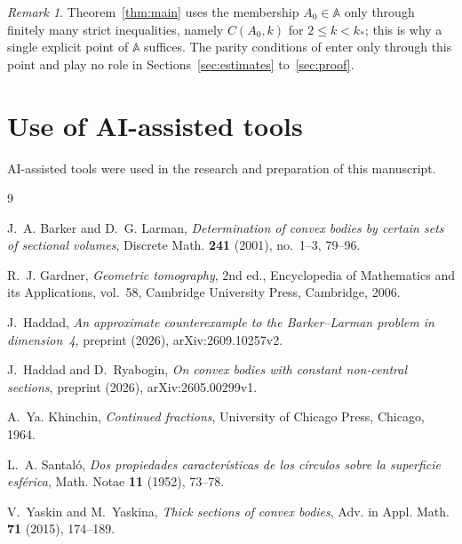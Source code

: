 \documentclass{amsart}
\theoremstyle{definition}
\theoremstyle{remark}
\newtheorem{remark}[theorem]{Remark}
\numberwithin{equation}{section}
\newcommand{\AAA}{\mathbb{A}}
\begin{document}
\begin{remark}
Theorem~\ref{thm:main} uses the membership $A_0\in\AAA$ only through finitely many strict inequalities, namely $C(A_0,k)$ for $2\le k<k_*$; this is why a single explicit point of $\AAA$ suffices. The parity conditions of \cite[Theorem~14]{HR} enter only through this point and play no role in Sections~\ref{sec:estimates} to~\ref{sec:proof}.
\end{remark}

\section*{Use of AI-assisted tools}

AI-assisted tools were used in the research and preparation of this manuscript.

\begin{thebibliography}{9}

J.~A. Barker and D.~G. Larman, \emph{Determination of convex bodies by certain sets of sectional volumes}, Discrete Math. \textbf{241} (2001), no.~1--3, 79--96.

R.~J. Gardner, \emph{Geometric tomography}, 2nd ed., Encyclopedia of Mathematics and its Applications, vol.~58, Cambridge University Press, Cambridge, 2006.

J.~Haddad, \emph{An approximate counterexample to the Barker--Larman problem in dimension~4}, preprint (2026), arXiv:2609.10257v2.

J.~Haddad and D.~Ryabogin, \emph{On convex bodies with constant non-central sections}, preprint (2026), arXiv:2605.00299v1.

A.~Ya. Khinchin, \emph{Continued fractions}, University of Chicago Press, Chicago, 1964.

L.~A. Santal\'o, \emph{Dos propiedades caracter\'isticas de los c\'irculos sobre la superficie esf\'erica}, Math. Notae \textbf{11} (1952), 73--78.

V.~Yaskin and M.~Yaskina, \emph{Thick sections of convex bodies}, Adv. in Appl. Math. \textbf{71} (2015), 174--189.

\end{thebibliography}
\end{document}
